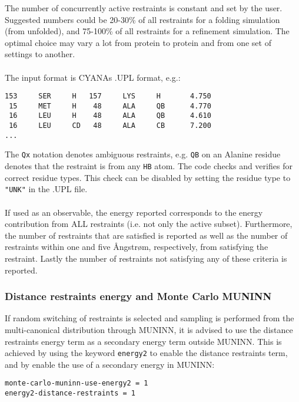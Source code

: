 The number of concurrently active restraints is constant and set by the user.
Suggested numbers could be 20-30\% of all restraints for a folding simulation (from unfolded), and 75-100\% of all restraints for a refinement simulation.
The optimal choice may vary a lot from protein to protein and from one set of settings to another.
\\\\The input format is CYANAs .UPL format, e.g.:
\begin{verbatim}
153     SER     H   157     LYS     H       4.750
 15     MET     H    48     ALA     QB      4.770
 16     LEU     H    48     ALA     QB      4.610
 16     LEU     CD   48     ALA     CB      7.200
...
\end{verbatim}
The \texttt{Qx} notation denotes ambiguous restraints, e.g. \texttt{QB} on an Alanine residue denotes that the restraint is from any \texttt{HB} atom.
The code checks and verifies for correct residue types.
This check can be disabled by setting the residue type to \texttt{"UNK"} in the .UPL file. 
\\\\If used as an observable, the energy reported corresponds to the energy contribution from ALL restraints (i.e. not only the active subset).
Furthermore, the number of restraints that are satisfied is reported as well as the number of restraints within one and five \AA ngstr\o m, respectively, from satisfying the restraint.
Lastly the number of restraints not satisfying any of these criteria is reported.

\subsubsection*{Distance restraints energy and Monte Carlo MUNINN }
If random switching of restraints is selected and sampling is performed from the multi-canonical distribution through MUNINN, it is advised to use the distance restraints energy term as a secondary energy term outside MUNINN. 
This is achieved by using the keyword \texttt{energy2} to enable the distance restraints term, and by enable the use of a secondary energy in MUNINN:
\begin{verbatim}
monte-carlo-muninn-use-energy2 = 1
energy2-distance-restraints = 1
\end{verbatim}
\begin{optiontable}
\end{optiontable}
